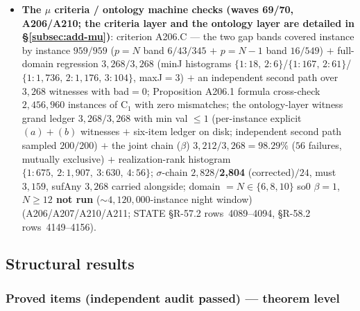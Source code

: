 \begin{itemize}
\item \textbf{The $\mu$ criteria / ontology machine checks (waves 69/70,
A206/A210; the criteria layer and the ontology layer are detailed in
\S\ref{subsec:add-mu})}: criterion A206.C --- the two gap bands covered
instance by instance $959/959$ ($p=N$ band $6/43/345$ $+$ $p=N-1$ band
$16/549$) $+$ full-domain regression $3{,}268/3{,}268$ (minJ histograms
$\{1{:}18,\,2{:}6\}$/$\{1{:}167,\,2{:}61\}$/$\{1{:}1{,}736,\,2{:}1{,}176,\,3{:}104\}$,
maxJ$=3$) $+$ an independent second path over $3{,}268$ witnesses with
bad$=0$; Proposition A206.1 formula cross-check $2{,}456{,}960$ instances
of C$_1$ with zero mismatches; the ontology-layer witness grand ledger
$3{,}268/3{,}268$ with min val $\le1$ (per-instance explicit $(a)+(b)$
witnesses $+$ six-item ledger on disk; independent second path sampled
$200/200$) $+$ the joint chain ($\beta$) $3{,}212/3{,}268=98.29\%$ ($56$
failures, mutually exclusive) $+$ realization-rank histogram
$\{1{:}675,\ 2{:}1{,}907,\ 3{:}630,\ 4{:}56\}$; $\sigma$-chain
$2{,}828/$\textbf{2,804} (corrected)$/24$, must $3{,}159$, sufAny $3{,}268$
carried alongside; domain $=N\in\{6,8,10\}$ so0 $\beta=1$, \textbf{$N\ge12$
not run} (${\sim}4{,}120{,}000$-instance night window) (A206/A207/A210/A211;
STATE \S R-57.2 rows~4089--4094, \S R-58.2 rows~4149--4156).
\end{itemize}

\subsection{Structural results}\label{subsec:add-structural}

\subsubsection{Proved items (independent audit passed) --- theorem level
\tierThm}\label{subsec:add-struct1}

